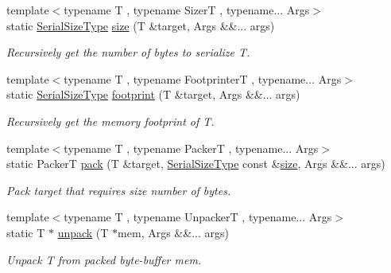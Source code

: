 \begin{DoxyCompactItemize}
\item 
{\footnotesize template$<$typename T , typename SizerT , typename... Args$>$ }\\static \hyperlink{namespacecheckpoint_a083f6674da3f94c2901b18c6d238217c}{Serial\+Size\+Type} \hyperlink{structcheckpoint_1_1dispatch_1_1_standard_a3ab80d79667a790dd38d56c7aa52544c}{size} (T \&target, Args \&\&... args)
\begin{DoxyCompactList}\small\item\em Recursively get the number of bytes to serialize {\ttfamily T}. \end{DoxyCompactList}\item 
{\footnotesize template$<$typename T , typename FootprinterT , typename... Args$>$ }\\static \hyperlink{namespacecheckpoint_a083f6674da3f94c2901b18c6d238217c}{Serial\+Size\+Type} \hyperlink{structcheckpoint_1_1dispatch_1_1_standard_ae48838b6ca5ce60c4521c46b229b7f00}{footprint} (T \&target, Args \&\&... args)
\begin{DoxyCompactList}\small\item\em Recursively get the memory footprint of {\ttfamily T}. \end{DoxyCompactList}\item 
{\footnotesize template$<$typename T , typename PackerT , typename... Args$>$ }\\static PackerT \hyperlink{structcheckpoint_1_1dispatch_1_1_standard_afe92288cac2dc35464ee33e91b4d91d0}{pack} (T \&target, \hyperlink{namespacecheckpoint_a083f6674da3f94c2901b18c6d238217c}{Serial\+Size\+Type} const \&\hyperlink{structcheckpoint_1_1dispatch_1_1_standard_a3ab80d79667a790dd38d56c7aa52544c}{size}, Args \&\&... args)
\begin{DoxyCompactList}\small\item\em Pack {\ttfamily target} that requires {\ttfamily size} number of bytes. \end{DoxyCompactList}\item 
{\footnotesize template$<$typename T , typename UnpackerT , typename... Args$>$ }\\static T $\ast$ \hyperlink{structcheckpoint_1_1dispatch_1_1_standard_a2115701d48c24ab6cbc0d811ef8840e3}{unpack} (T $\ast$mem, Args \&\&... args)
\begin{DoxyCompactList}\small\item\em Unpack {\ttfamily T} from packed byte-\/buffer {\ttfamily mem}. \end{DoxyCompactList}\item 

\end{DoxyCompactItemize}
